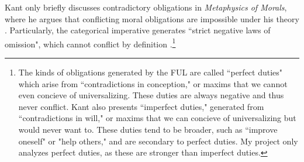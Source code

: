 \begin{isabellebody}
\begin{isamarkuptext}
Kant only briefly discusses contradictory obligations in \emph{Metaphysics of Morals}, where he argues that 
conflicting moral obligations are impossible under his theory \cite[V224]{metaphysicsintro}. Particularly, the categorical imperative generates 
``strict negative laws of omission", which cannot conflict by definition \cite[45]{timmerman}.\footnote{The 
kinds of obligations generated by the FUL are called ``perfect duties" which arise from ``contradictions 
in conception," or maxims that we cannot even concieve of universalizing. These duties are always negative 
and thus never conflict. Kant also presents ``imperfect duties," generated from ``contradictions in will,"
or maxims that we can concieve of universalizing but would never want to. These duties tend to be broader, 
such as ``improve oneself" or "help others," and are secondary to perfect duties. My project only analyzes 
perfect duties, as these are stronger than imperfect duties.} 


\end{isamarkuptext}
\end{isabellebody}
